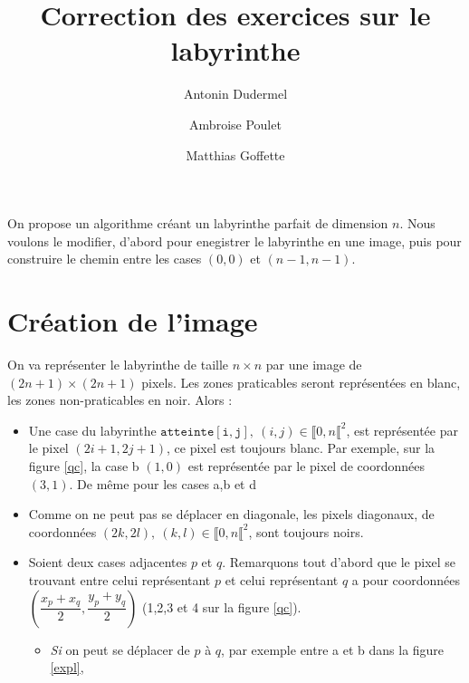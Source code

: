 \documentclass[11pt,a4paper]{article}
\title{Correction des exercices sur le labyrinthe}
\date{}
\author{Antonin Dudermel \and Ambroise Poulet \and Matthias Goffette}
\begin{document}

\maketitle

\begin{it}
On propose un algorithme créant un labyrinthe parfait de dimension $n$. Nous voulons le modifier, d'abord pour enegistrer le labyrinthe en une image, puis pour construire le chemin entre les cases $(0,0)$ et $(n-1,n-1)$.
\end{it}

\section{Création de l'image}

On va représenter le labyrinthe de taille $n\times n$ par une image de $(2n+1)\times (2n+1)$ pixels. Les zones praticables seront représentées en blanc, les zones non-praticables en noir. Alors :
\begin{itemize}
	\item Une case du labyrinthe $\mathtt{atteinte[i,j]}, ~ (i,j) \in \llbracket 0,n \llbracket ^2$, est représentée par le pixel $(2i+1,2j+1)$, ce pixel est toujours blanc. Par exemple, sur la figure \ref{qc}, la case b $(1,0)$ est représentée par le pixel de coordonnées $(3,1)$. De même pour les cases a,b et d
	\item Comme on ne peut pas se déplacer en diagonale, les pixels diagonaux, de coordonnées $(2k,2l), ~ (k,l) \in \llbracket 0,n \llbracket ^2 $, sont toujours noirs.
	\item 
		Soient deux cases adjacentes $p$ et $q$. Remarquons tout d'abord que le pixel se trouvant entre celui représentant $p$ et celui représentant $q$ a pour coordonnées $(\dfrac{x_p+x_q}{2},\dfrac{y_p+y_q}{2})$ (1,2,3 et 4 sur la figure \ref{qc}). 
	\begin{itemize}
		\item {\itshape Si} on peut se déplacer de $p$ à $q$, par exemple entre a et b dans la figure \ref{expl}, 

	\end{itemize}
\end{itemize}
\end{document}
